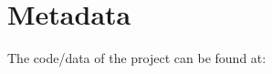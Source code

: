 \section{Metadata}

\noindent
The code/data of the project can be found at:
\begin{center}
\end{center}

